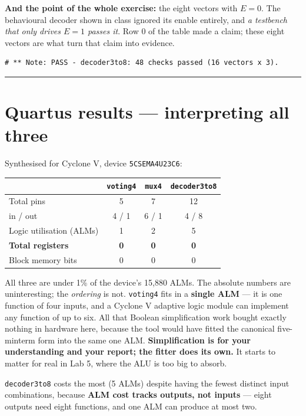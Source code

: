 \documentclass[11pt]{article}
\newcommand{\code}[1]{\texttt{#1}}
\newcommand{\hr}{\vspace{2pt}\hrule\vspace{6pt}}
\begin{document}
\textbf{And the point of the whole exercise:} the eight vectors with $E = 0$. The
behavioural decoder shown in class ignored its enable entirely, and \emph{a
testbench that only drives $E = 1$ passes it}. Row 0 of the table made a claim; these
eight vectors are what turn that claim into evidence.

\begin{lstlisting}
# ** Note: PASS - decoder3to8: 48 checks passed (16 vectors x 3).
\end{lstlisting}

\vspace{4pt}\hr

\section*{Quartus results --- interpreting all three}

Synthesised for Cyclone V, device \code{5CSEMA4U23C6}:

\begin{center}
\begin{tabular}{lccc}
\toprule
& \code{voting4} & \code{mux4} & \code{decoder3to8} \\
\midrule
Total pins & 5 & 7 & 12 \\
\quad in / out & 4 / 1 & 6 / 1 & 4 / 8 \\
Logic utilisation (ALMs) & 1 & 2 & 5 \\
\textbf{Total registers} & \textbf{0} & \textbf{0} & \textbf{0} \\
Block memory bits & 0 & 0 & 0 \\
\bottomrule
\end{tabular}
\end{center}

All three are under 1\% of the device's 15{,}880 ALMs. The absolute numbers are
uninteresting; the \emph{ordering} is not. \code{voting4} fits in a
\textbf{single ALM} --- it is one function of four inputs, and a Cyclone V adaptive
logic module can implement any function of up to six. All that Boolean simplification
work bought exactly nothing in hardware here, because the tool would have fitted the
canonical five-minterm form into the same one ALM. \textbf{Simplification is for your
understanding and your report; the fitter does its own.} It starts to matter for real
in Lab 5, where the ALU is too big to absorb.

\code{decoder3to8} costs the most (5 ALMs) despite having the fewest distinct input
combinations, because \textbf{ALM cost tracks outputs, not inputs} --- eight outputs
need eight functions, and one ALM can produce at most two.
\end{document}
